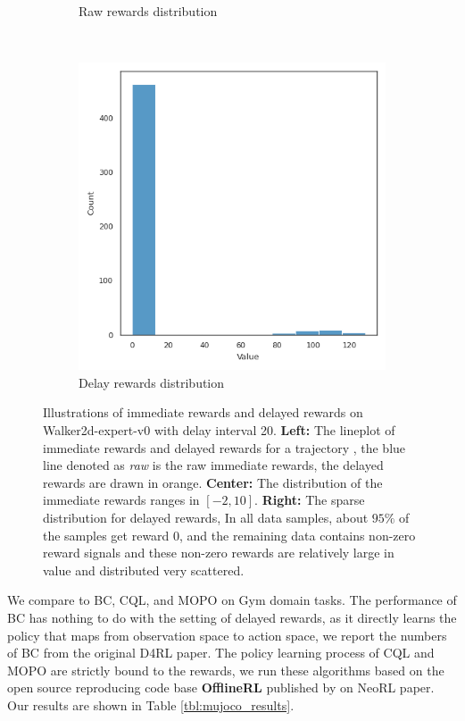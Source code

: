 \begin{figure}[H]
\begin{subfigure}{0.31\textwidth}
    \caption{Raw rewards distribution}
    \end{subfigure}
    ~
    \begin{subfigure}{0.31\textwidth}
    \includegraphics[width=\textwidth]{assets/delay_mode-constant-delay-20_distribution_delay_0_delayed.png}
    \caption{Delay rewards distribution}
    \end{subfigure}
    \caption{Illustrations of immediate rewards and delayed rewards on Walker2d-expert-v0 with delay interval 20. \textbf{Left:} The lineplot of immediate rewards and delayed rewards for a trajectory
    , the blue line denoted as \textit{raw} is the raw immediate rewards, the delayed rewards are drawn in orange. \textbf{Center:} The distribution of the immediate rewards ranges in $\left[-2, 10\right]$.
    \textbf{Right:} The sparse distribution for delayed rewards, In all data samples, about $95\%$ of the samples get reward 0, and the remaining data contains non-zero reward signals and these non-zero rewards are relatively large in value and distributed very scattered.}
    \label{fig:fig1}
\end{figure}


We compare to BC, CQL, and MOPO on Gym domain tasks. The performance of BC has 
nothing to do with the setting of delayed rewards, as it directly learns the 
policy that maps from observation space to action space, we report the numbers of BC from the original D4RL paper. The policy learning process of CQL and MOPO are strictly bound to the rewards, we run these algorithms based on the
open source reproducing code base \textbf{OfflineRL} published by \citeauthor{qinNeoRLRealWorldBenchmark2021} 
on NeoRL paper. Our results are shown in Table \ref{tbl:mujoco_results}. 


